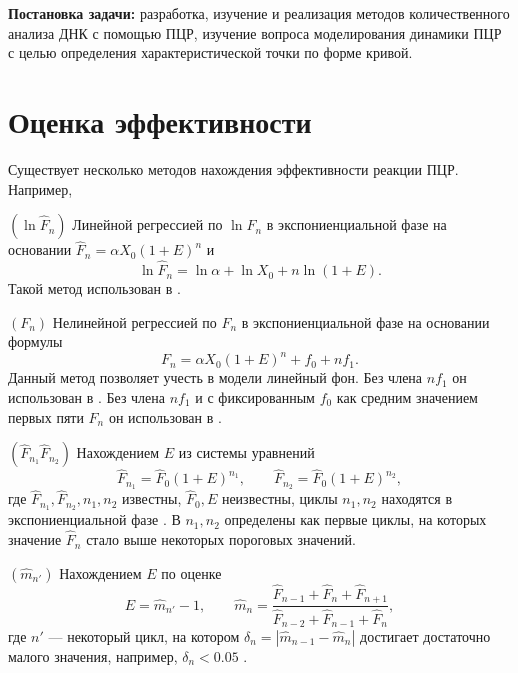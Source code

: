   {\bf Постановка задачи:} разработка, изучение и реализация методов
количественного анализа ДНК с помощью ПЦР, изучение вопроса моделирования
динамики ПЦР с целью определения характеристической точки по форме кривой.

\section{Оценка эффективности}\label{sec:eff}

Существует несколько методов нахождения эффективности реакции ПЦР. Например,
\begin{labeldesc}
  \item[$(\ln\hat F_{n})$]\label{item:method_log}
  Линейной регрессией по $\ln\hat F_{n}$ в экспониенциальной фазе на
  основании $\hat F_{n}=\alpha X_0(1+E)^{n}$ и
  \[
    \ln \hat F_{n}=\ln\alpha + \ln X_0+n\ln(1+E).
  \]
  Такой метод использован в
  \cite{wiesnerCountingTargetMolecules1992,ramakersAssumptionfreeAnalysisQuantitative2003}.

  \item[$(F_{n})$]\label{item:method_lin}
  Нелинейной регрессией по $F_{n}$ в экспониенциальной фазе на основании
  формулы
  \[
    F_{n}=\alpha X_0(1+E)^{n}+f_0+nf_1.
  \]
  Данный метод позволяет учесть в модели линейный фон. Без члена $nf_1$ он
  использован в \cite{tichopadStandardizedDeterminationRealtime2003}. Без
  члена $nf_1$ и с фиксированным $f_0$ как средним значением первых пяти
  $F_{n}$ он использован в \cite{barKineticOutlierDetection2003}.

  \item[$(\hat F_{n_1}\hat F_{n_2})$]\label{item:method_sys}
  Нахождением $E$ из системы уравнений
  \[
    \hat F_{n_1}=\hat F_0(1+E)^{n_1},\qquad \hat F_{n_2}=\hat F_0(1+E)^{n_2},
  \]
  где $\hat F_{n_1},\hat F_{n_2},n_1,n_2$ известны, $\hat F_0,E$ неизвестны,
  циклы $n_1,n_2$ находятся в экспониенциальной фазе
  \cite{liuNewQuantitativeMethod2002}. В \cite{liuNewQuantitativeMethod2002}
  $n_1,n_2$ определены как первые циклы, на которых значение $\hat F_{n}$ стало
  выше некоторых пороговых значений.

  \item[$(\hat m_{n'})$]\label{item:method_estimate}
  Нахождением $E$ по оценке
  \[
    E=\hat m_{n'}-1,\qquad
    \hat m_{n}=\frac{\hat F_{n-1}+\hat F_{n}+\hat F_{n+1}}
    {\hat F_{n-2}+\hat F_{n-1}+\hat F_{n}},
  \]
  где $n'$ --- некоторый цикл, на котором
  $\delta_{n}=|\hat m_{n-1}-\hat m_{n}|$ достигает достаточно малого значения,
  например, $\delta_{n}<0.05$ \cite{peccoudStatisticalEstimationsPCR1998}.


\end{labeldesc}
